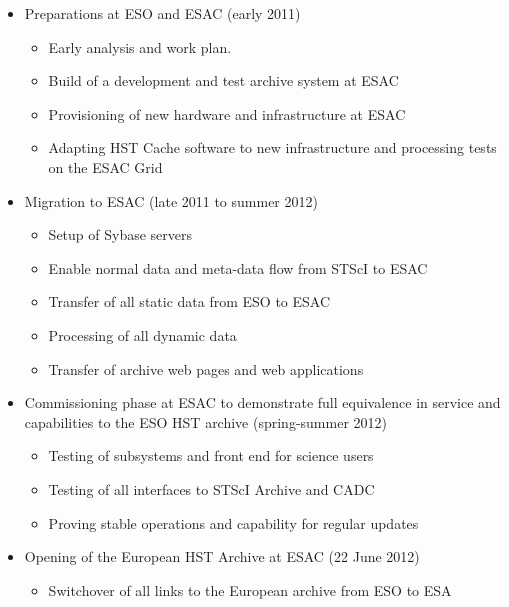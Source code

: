 \begin{itemize} \itemsep0pt \parskip0pt 
\item Preparations at ESO and ESAC (early 2011) 
 \begin{itemize} \itemsep0pt \parskip0pt 
  \item Early analysis and work plan.
  \item Build of a development and test archive system at ESAC
  \item Provisioning of new hardware and infrastructure at ESAC
  \item Adapting HST Cache software  to new infrastructure and processing tests on the ESAC Grid  
  \end{itemize}
\item Migration to ESAC (late 2011 to  summer 2012)
  \begin{itemize} \itemsep0pt \parskip0pt 
  \item Setup of Sybase servers  
   \item Enable normal data and meta-data flow from STScI to ESAC
  \item Transfer of all static data from ESO to ESAC
  \item Processing of all dynamic data
  \item Transfer of archive web pages and web applications
  \end{itemize}
\item Commissioning phase at ESAC to demonstrate full equivalence in service and capabilities to the ESO HST archive (spring-summer 2012)
\begin{itemize} \itemsep0pt \parskip0pt 
\item Testing of subsystems and front end for science users
\item	Testing of all interfaces to STScI Archive and CADC
\item	Proving stable operations and capability for regular updates
\end{itemize} \itemsep0pt \parskip0pt  
\item Opening of the European HST Archive at ESAC  (22 June 2012)
\begin{itemize}
\item Switchover of all links to the European archive from ESO to ESA

\end{itemize}
\end{itemize}
